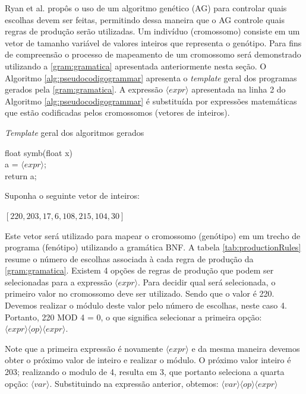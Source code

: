 Ryan et al. \cite{ryan1998grammatical}  propôs o uso de um algoritmo genético (AG) para controlar quais escolhas devem ser feitas, permitindo dessa maneira que o AG controle quais regras de produção serão utilizadas. Um indivíduo (cromossomo) consiste em um vetor de tamanho variável de valores inteiros que representa o genótipo. Para fins de compreensão o processo de mapeamento de um cromossomo será demonstrado utilizando a \autoref{gram:gramatica} apresentada anteriormente nesta seção. O Algoritmo \ref{alg:pseudocodigogrammar} apresenta o \textit{template} geral dos programas gerados pela \autoref{gram:gramatica}. A expressão $\langle expr \rangle$ apresentada na linha 2 do Algoritmo \ref{alg:pseudocodigogrammar} é substituída por expressões matemáticas que estão codificadas pelos cromossomos (vetores de inteiros). 

\begin{algorithm}
	\caption{\textit{Template} geral dos algoritmos gerados}
	\label{alg:pseudocodigogrammar}
	float symb(float x) { \\
		a = $\langle expr \rangle$;   \\
		return a;  \\
	}	
\end{algorithm}

\noindent
Suponha o seguinte vetor de inteiros:

\begin{center}
	$ [220, 203, 17, 6, 108, 215, 104, 30] $
\end{center}


Este vetor será utilizado para mapear o cromossomo (genótipo) em um trecho de programa (fenótipo) utilizando a gramática BNF. 
A tabela \autoref{tab:productionRules} resume o número de escolhas associada à cada regra de produção da \autoref{gram:gramatica}. Existem 4 opções de regras de produção que podem ser selecionadas para a expressão $ \langle expr \rangle$. Para decidir qual será selecionada, o primeiro valor no cromossomo deve ser utilizado. Sendo que o valor é 220. Devemos realizar o módulo deste valor pelo número de escolhas, neste caso 4. Portanto, 220 MOD 4 = 0, o que significa selecionar a primeira opção: $\langle expr \rangle \langle op \rangle \langle expr \rangle$.

Note que a primeira expressão é novamente $ \langle expr \rangle$ e da mesma maneira devemos obter o próximo valor de inteiro e realizar o módulo. O próximo valor inteiro é 203; realizando o modulo de 4, resulta em 3, que portanto seleciona a quarta opção: $ \langle var \rangle$. Substituindo na expressão anterior, obtemos: $ \langle var \rangle \langle op \rangle \langle expr \rangle$

